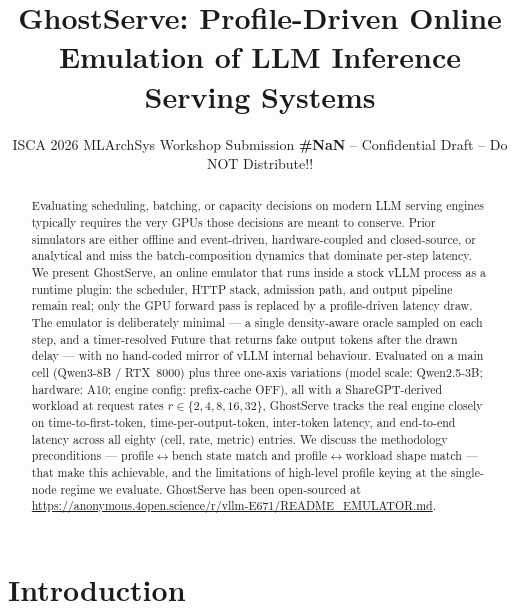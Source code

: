 \documentclass[conference]{IEEEtran}
\newcommand{\sysname}{GhostServe}
\begin{document}
\pdfpagewidth=8.5in
\pdfpageheight=11in

\newcommand{\iscasubmissionnumber}{NaN}


\title{\sysname{}: Profile-Driven Online Emulation of LLM Inference Serving Systems}
\author{\normalsize{ISCA 2026 MLArchSys Workshop Submission
    \textbf{\#\iscasubmissionnumber} -- Confidential Draft -- Do NOT Distribute!!}}

\maketitle
\thispagestyle{plain}
\pagestyle{plain}

\begin{abstract}
Evaluating scheduling, batching, or capacity decisions on modern LLM
serving engines typically requires the very GPUs those decisions are
meant to conserve. Prior simulators are either offline and
event-driven, hardware-coupled and closed-source, or analytical and
miss the batch-composition dynamics that dominate per-step latency.
We present \sysname{}, an online emulator that runs inside a stock
vLLM process as a runtime plugin: the scheduler, HTTP stack,
admission path, and output pipeline remain real; only the GPU
forward pass is replaced by a profile-driven latency draw. The
emulator is deliberately minimal --- a single density-aware oracle
sampled on each step, and a timer-resolved Future that returns fake
output tokens after the drawn delay --- with no hand-coded mirror of
vLLM internal behaviour. Evaluated on a main cell (Qwen3-8B /
RTX~8000) plus three one-axis variations (model scale:
Qwen2.5-3B; hardware: A10; engine config: prefix-cache OFF),
all with a ShareGPT-derived workload at request rates
$r\in\{2,4,8,16,32\}$, \sysname{} tracks the real engine
closely on time-to-first-token, time-per-output-token,
inter-token latency, and end-to-end latency across all
eighty (cell, rate, metric) entries. We
discuss the methodology preconditions ---
profile$\leftrightarrow$bench state match and
profile$\leftrightarrow$workload shape match --- that make this
achievable, and the limitations of high-level profile keying at the
single-node regime we evaluate.
\sysname{} has been open-sourced at
\textcolor{blue}{\url{https://anonymous.4open.science/r/vllm-E671/README_EMULATOR.md}}.
\end{abstract}

\section{Introduction}
\end{document}
